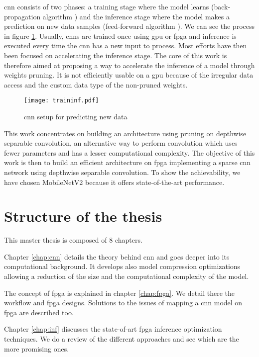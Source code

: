\acrshort{cnn} consists of two phases: a training stage where the model learns (back-propagation algorithm \cite{lecun_backpropagation_1989}) and the inference stage where the model makes a prediction on new data samples (feed-forward algorithm \cite{zhang_optimizing_2015}). We can see the process in figure \ref{fig:traininf}. Usually, \acrshort{cnn}s are trained once using \acrshort{gpu} or \acrshort{fpga} and inference is executed every time the \acrshort{cnn} has a new input to process. Most efforts have then been focused on accelerating the inference stage. The core of this work is therefore aimed at proposing a way to accelerate the inference of a model through weights pruning. It is not efficiently usable on a \acrshort{gpu} because of the irregular data access and the custom data type of the non-pruned weights.
%
\begin{figure}
    \texttt{[image: traininf.pdf]}
    \caption{\acrshort{cnn} setup for predicting new data}
    \label{fig:traininf}
\end{figure}

\noindent This work concentrates on building an architecture using pruning on depthwise separable convolution, an alternative way to perform convolution which uses fewer parameters and has a lesser computational complexity. The objective of this work is then to build an efficient architecture on \acrshort{fpga} implementing a sparse \acrshort{cnn} network using depthwise separable convolution. To show the achievability, we have chosen MobileNetV2 because it offers state-of-the-art performance.
%
%
\section*{Structure of the thesis}
%
%
This master thesis is composed of 8 chapters.

Chapter \ref{chap:cnn} details the theory behind \acrshort{cnn} and goes deeper into its computational background. It develops also model compression optimizations allowing a reduction of the size and the computational complexity of the model.

The concept of \acrshort{fpga} is explained in chapter \ref{chap:fpga}. We detail there the workflow and \acrshort{fpga} designs. Solutions to the issues of mapping a \acrshort{cnn} model on \acrshort{fpga} are described too.

Chapter \ref{chap:inf} discusses the state-of-art \acrshort{fpga} inference optimization techniques. We do a review of the different approaches and see which are the more promising ones.


